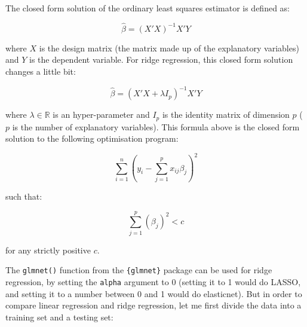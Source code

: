 \documentclass[]{gitbook}
\newenvironment{Shaded}{\begin{snugshade}}{\end{snugshade}}
\newcommand{\DataTypeTok}[1]{\textcolor[rgb]{0.13,0.29,0.53}{#1}}
\newcommand{\DecValTok}[1]{\textcolor[rgb]{0.00,0.00,0.81}{#1}}
\newcommand{\FloatTok}[1]{\textcolor[rgb]{0.00,0.00,0.81}{#1}}
\newcommand{\KeywordTok}[1]{\textcolor[rgb]{0.13,0.29,0.53}{\textbf{#1}}}
\newcommand{\NormalTok}[1]{#1}
\newcommand{\OperatorTok}[1]{\textcolor[rgb]{0.81,0.36,0.00}{\textbf{#1}}}
\newcommand{\OtherTok}[1]{\textcolor[rgb]{0.56,0.35,0.01}{#1}}
\newcommand{\StringTok}[1]{\textcolor[rgb]{0.31,0.60,0.02}{#1}}
\theoremstyle{definition}
\theoremstyle{definition}
\theoremstyle{definition}
\theoremstyle{remark}
\begin{document}
The closed form solution of the ordinary least squares estimator is
defined as:

\[
\widehat{\beta} = (X'X)^{-1}X'Y
\]

where \(X\) is the design matrix (the matrix made up of the explanatory
variables) and \(Y\) is the dependent variable. For ridge regression,
this closed form solution changes a little bit:

\[
\widehat{\beta} = (X'X + \lambda I_p)^{-1}X'Y
\]

where \(\lambda \in \mathbb{R}\) is an hyper-parameter and \(I_p\) is
the identity matrix of dimension \(p\) (\(p\) is the number of
explanatory variables). This formula above is the closed form solution
to the following optimisation program:

\[
\sum_{i=1}^n \left(y_i - \sum_{j=1}^px_{ij}\beta_j\right)^2 
\]

such that:

\[
\sum_{j=1}^p(\beta_j)^2 < c
\]

for any strictly positive \(c\).

The \texttt{glmnet()} function from the \texttt{\{glmnet\}} package can
be used for ridge regression, by setting the \texttt{alpha} argument to
0 (setting it to 1 would do LASSO, and setting it to a number between 0
and 1 would do elasticnet). But in order to compare linear regression
and ridge regression, let me first divide the data into a training set
and a testing set:

\begin{Shaded}
\end{Shaded}
\end{document}
